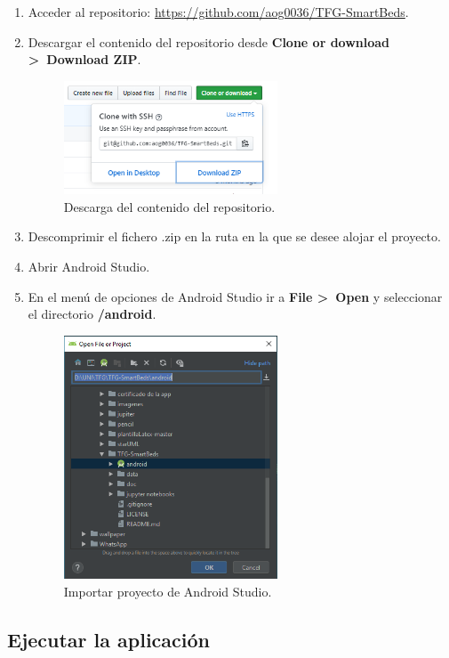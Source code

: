 \begin{enumerate}
	\item Acceder al repositorio: \url{https://github.com/aog0036/TFG-SmartBeds}. 
	\item Descargar el contenido del repositorio desde \textbf{Clone or download >~Download ZIP}. 
	\begin{figure}[H]
		\centering
		\includegraphics[width=0.6\textwidth]{../img/download.png}
		\caption{Descarga del contenido del repositorio.}
		\label{fig:download}
	\end{figure}
	\item Descomprimir el fichero .zip en la ruta en la que se desee alojar el proyecto. 
	\item Abrir Android Studio. 
	\item En el menú de opciones de Android Studio ir a \textbf{File >~Open} y seleccionar el directorio \textbf{/android}. 
	\begin{figure}[H]
		\centering
		\includegraphics[width=0.6\textwidth]{../img/open.png}
		\caption{Importar proyecto de Android Studio.}
		\label{fig:open}
	\end{figure}
\end{enumerate}

\subsection{Ejecutar la aplicación}

